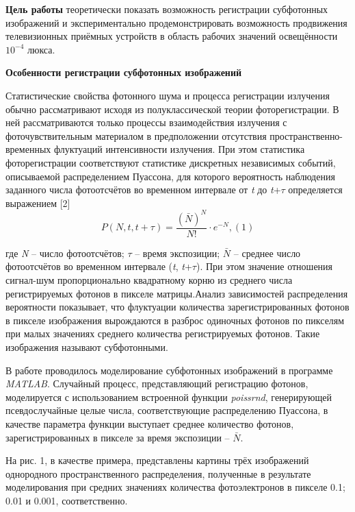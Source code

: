 \documentclass[11pt]{article}
\begin{document}
\textbf{Цель работы} теоретически показать возможность регистрации субфотонных изображений и экспериментально продемонстрировать возможность продвижения телевизионных приёмных устройств в область рабочих значений освещённости $10^{-4}$ люкса.

\begin{center}
\textbf{Особенности регистрации субфотонных изображений}
\end{center}

Статистические свойства фотонного шума и процесса регистрации излучения
обычно рассматривают исходя из полуклассической теории фоторегистрации. В
ней рассматриваются только процессы взаимодействия излучения с фоточувствительным материалом в предположении отсутствия пространственно-временных флуктуаций интенсивности излучения.
При этом статистика фоторегистрации соответствуют статистике дискретных
независимых событий, описываемой распределением Пуассона, для которого вероятность наблюдения заданного числа фотоотсчётов во временном интервале от
\textit{t} до \textit{t}+$\tau$ определяется выражением [2]
$$P(N,t,t+\tau)= \frac{(\bar N)^N}{N!} \cdot e^{-N} , (1)$$

где \textit{N} – число фотоотсчётов; $\tau$ – время экспозиции; $\bar N$ – среднее число фотоотсчётов во временном интервале (\textit{t}, \textit{t}+$\tau$). При этом значение отношения сигнал-шум пропорционально квадратному корню из среднего числа регистрируемых фотонов в пикселе матрицы.Анализ зависимостей распределения вероятности показывает, что флуктуации количества зарегистрированных фотонов в пикселе изображения вырождаются в разброс одиночных фотонов по пикселям при малых значениях среднего количества регистрируемых фотонов. Такие изображения называют субфотонными.

В работе проводилось моделирование субфотонных изображений в программе
\textit{MATLAB}. Случайный процесс, представляющий регистрацию фотонов, моделируется с использованием встроенной функции \textit{poissrnd}, генерирующей псевдослучайные целые числа, соответствующие распределению Пуассона, в качестве параметра функции выступает среднее количество фотонов, зарегистрированных в пикселе за время экспозиции – $\bar N$.

На рис. 1, в качестве примера, представлены картины трёх изображений однородного пространственного распределения, полученные в результате моделирования при средних значениях количества фотоэлектронов в пикселе 0.1; 0.01 и 0.001, соответственно.
\end{document}
